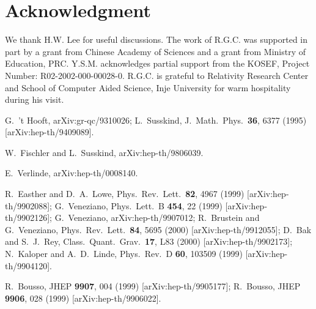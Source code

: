 \documentclass[a4paper,12pt]{article}
\begin{document}
\section*{Acknowledgment}

We thank H.W. Lee for useful discussions.
The work of R.G.C. was supported in part by a grant from Chinese
Academy of Sciences and a grant from Ministry of Education, PRC.
Y.S.M. acknowledges partial support from the KOSEF, Project
Number: R02-2002-000-00028-0.
R.G.C. is grateful to Relativity Research Center and School of Computer Aided
Science, Inje University for warm hospitality during his visit.

\begin{thebibliography}{99}
G.~'t Hooft,
arXiv:gr-qc/9310026;
L.~Susskind,
J.\ Math.\ Phys.\  {\bf 36}, 6377 (1995) [arXiv:hep-th/9409089].

 W.~Fischler and L.~Susskind,
arXiv:hep-th/9806039.

E.~Verlinde,
arXiv:hep-th/0008140.

R.~Easther and D.~A.~Lowe,
Phys.\ Rev.\ Lett.\  {\bf 82}, 4967 (1999) [arXiv:hep-th/9902088];
G.~Veneziano,
Phys.\ Lett.\ B {\bf 454}, 22 (1999) [arXiv:hep-th/9902126];
G.~Veneziano,
arXiv:hep-th/9907012;
R.~Brustein and G.~Veneziano,
Phys.\ Rev.\ Lett.\  {\bf 84}, 5695 (2000) [arXiv:hep-th/9912055];
D.~Bak and S.~J.~Rey,
Class.\ Quant.\ Grav.\  {\bf 17}, L83 (2000)
[arXiv:hep-th/9902173];
N.~Kaloper and A.~D.~Linde,
Phys.\ Rev.\ D {\bf 60}, 103509 (1999) [arXiv:hep-th/9904120].

R.~Bousso,
JHEP {\bf 9907}, 004 (1999) [arXiv:hep-th/9905177];
R.~Bousso,
JHEP {\bf 9906}, 028 (1999) [arXiv:hep-th/9906022].


\end{thebibliography}
\end{document}

